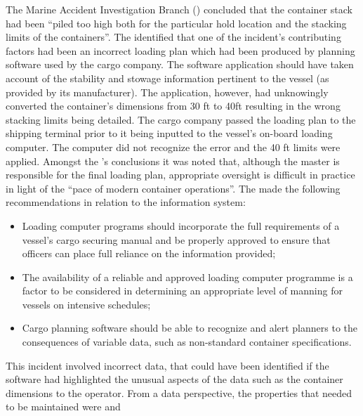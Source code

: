The Marine Accident Investigation Branch () concluded that the container stack had been ``piled too high both for the particular hold location and the stacking limits of the containers''. The  identified that one of the incident’s contributing factors had been an incorrect loading plan which had been produced by planning software used by the cargo company. The software application should have taken account of the stability and stowage \gls{information} pertinent to the vessel (as provided by its manufacturer). The application, however, had unknowingly converted the container’s dimensions from 30 ft to 40ft resulting in the wrong stacking limits being detailed. The cargo company passed the loading plan to the shipping terminal prior to it being inputted to the vessel’s on-board loading computer. The computer did not recognize the error and the 40 ft limits were applied. Amongst the ’s conclusions it was noted that, although the master is responsible for the final loading plan, appropriate oversight is difficult in practice in light of the ``pace of modern container operations''. The  made the following recommendations in relation to the \gls{information} system:
\begin{itemize}
\item Loading computer programs should incorporate the full requirements of a vessel’s cargo securing manual and be properly approved to ensure that officers can place full reliance on the \gls{information} provided;
\item The \gls{availability} of a reliable and approved loading computer programme is a factor to be considered in determining an appropriate level of manning for vessels on intensive schedules; 
\item Cargo planning software should be able to recognize and alert planners to the consequences of variable data, such as non-standard container specifications.
\end{itemize}

This incident involved incorrect data, that could have been identified if the software had highlighted the unusual aspects of the data such as the container dimensions to the operator. From a data perspective, the properties that needed to be maintained were  and 

